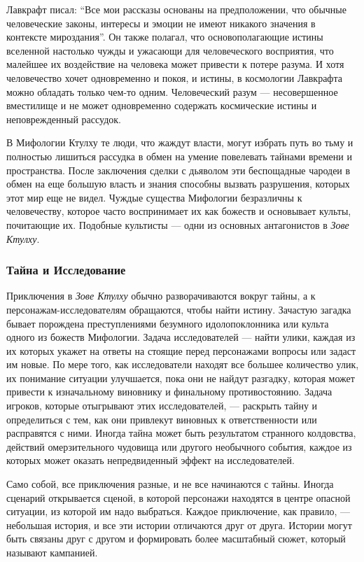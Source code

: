 \documentclass[letterpaper,twocolumn,openany, twoside, 11pt, usenames]{cocbook}
\begin{document}
Лавкрафт писал: ``Все мои рассказы основаны на предположении, что обычные человеческие законы, интересы и эмоции не имеют никакого значения в контексте мироздания''. Он также полагал, что основополагающие истины вселенной настолько чужды и ужасающи для человеческого восприятия, что малейшее их воздействие на человека может привести к потере разума. И хотя человечество хочет одновременно и покоя, и истины, в космологии Лавкрафта можно обладать только чем-то одним. Человеческий разум --- несовершенное вместилище и не может одновременно содержать космические истины и неповрежденный рассудок.

В Мифологии Ктулху те люди, что жаждут власти, могут избрать путь во тьму и полностью лишиться рассудка в обмен на умение повелевать тайнами времени и пространства. После заключения сделки с дьяволом эти беспощадные чародеи в обмен на еще большую власть и знания способны вызвать разрушения, которых этот мир еще не видел. Чуждые существа Мифологии безразличны к человечеству, которое часто воспринимает их как божеств и основывает культы, почитающие их. Подобные культисты --- одни из основных антагонистов в {\it Зове Ктулху}.

\subsubsection*{\nohyphens{Тайна и Исследование}}

Приключения в {\it Зове Ктулху} обычно разворачиваются вокруг тайны, а к персонажам-исследователям обращаются, чтобы найти истину. Зачастую загадка бывает порождена преступлениями безумного идолопоклонника или культа одного из божеств Мифологии. Задача исследователей --- найти улики, каждая из их которых укажет на ответы на стоящие перед персонажами вопросы или задаст им новые. По мере того, как исследователи находят все большее количество улик, их понимание ситуации улучшается, пока они не найдут разгадку, которая может привести к изначальному виновнику и финальному противостоянию. Задача игроков, которые отыгрывают этих исследователей, --- раскрыть тайну и определиться с тем, как они привлекут виновных к ответственности или расправятся с ними. Иногда тайна может быть результатом странного колдовства, действий омерзительного чудовища или другого необычного события, каждое из которых может оказать непредвиденный эффект на исследователей.

Само собой, все приключения разные, и не все начинаются с тайны. Иногда сценарий открывается сценой, в которой персонажи находятся в центре опасной ситуации, из которой им надо выбраться. Каждое приключение, как правило, --- небольшая история, и все эти истории отличаются друг от друга. Истории могут быть связаны друг с другом и формировать более масштабный сюжет, который называют кампанией.
\end{document}
